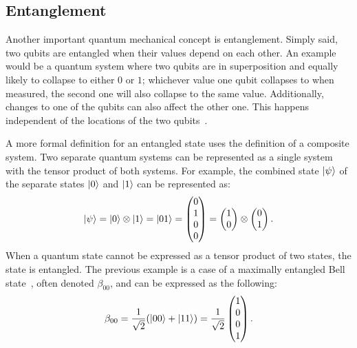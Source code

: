 \subsection{Entanglement}
\label{sec:background_entanglement}
Another important quantum mechanical concept is entanglement. Simply said, two qubits are entangled when their values depend on each other. An example would be a quantum system where two qubits are in superposition and equally likely to collapse to either $0$ or $1$; whichever value one qubit collapses to when measured, the second one will also collapse to the same value.
Additionally, changes to one of the qubits can also affect the other one. This happens independent of the locations of the two qubits~\cite{RDB*22, HHHH09}.

A more formal definition for an entangled state uses the definition of a composite system. Two separate quantum systems can be represented as a single system with the tensor product of both systems. For example, the combined state $\ket{\psi}$ of the separate states $\ket{0}$ and $\ket{1}$ can be represented as:
\begin{equation*}
    \ket{\psi} 
    = \ket{0} \otimes \ket{1} 
    = \ket{01} 
    = \begin{pmatrix}
        0 \\    
        1 \\    
        0 \\    
        0     
    \end{pmatrix}
    = \begin{pmatrix}
        1 \\ 0
    \end{pmatrix} \otimes 
    \begin{pmatrix}
        0 \\ 1
    \end{pmatrix}.
\end{equation*} 
When a quantum state cannot be expressed as a tensor product of two states, the state is entangled. The previous example is a case of a maximally entangled Bell state~\cite{DiCh20a, MHH19}, often denoted $\beta_{00}$, and can be expressed as the following:
\begin{equation*}
    \beta_{00} = \frac{1}{\sqrt{2}} (\ket{00} + \ket{11}) = \frac{1}{\sqrt{2}} 
    \begin{pmatrix}
        1 \\
        0 \\
        0 \\
        1    
    \end{pmatrix}.
\end{equation*}


